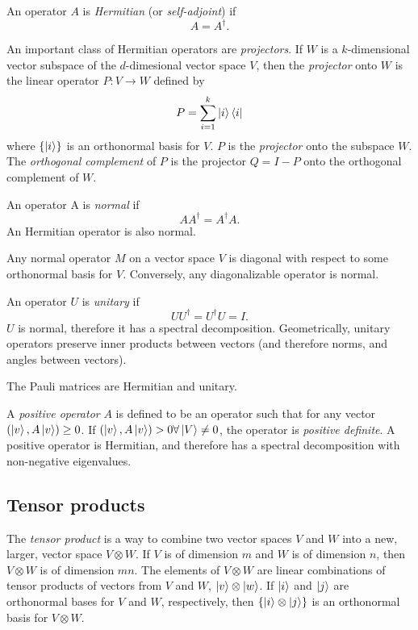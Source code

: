 An operator $A$ is \emph{Hermitian} (or \emph{self-adjoint}) if
\[
    A = A^\dagger.
\]

An important class of Hermitian operators are \emph{projectors}.
If $W$ is a $k$-dimensional vector subspace of the $d$-dimesional vector space $V$,
then the \emph{projector} onto $W$ is the linear operator $P: V \to W$ defined by
\[
    P = \sum_{i=1}^k \ket{i}\bra{i}
\]
where $\{\ket{i}\}$ is an orthonormal basis for $V$.
$P$ is the \emph{projector} onto the subspace $W$.
The \emph{orthogonal complement} of $P$ is the projector $Q = I-P$ onto the orthogonal complement of $W$.

An operator A is \emph{normal} if
\[
    AA^\dagger = A^\dagger A.
\]
An Hermitian operator is also normal.

\begin{theorem}
Any normal operator $M$ on a vector space $V$ is diagonal with respect to some orthonormal basis for $V$.
Conversely, any diagonalizable operator is normal.
\end{theorem}

An operator $U$ is \emph{unitary} if
\[
    UU^\dagger = U^\dagger U = I.
\]
$U$ is normal, therefore it has a spectral decomposition.
Geometrically, unitary operators preserve inner products between vectors
(and therefore norms, and angles between vectors).

The Pauli matrices are Hermitian and unitary.

A \emph{positive operator} $A$ is defined to be an operator such that for any vector $(\ket{v}, A\ket{v}) \geq 0$.
If $(\ket{v}, A\ket{v}) > 0 \forall \ket{V} \neq 0$, the operator is \emph{positive definite}.
A positive operator is Hermitian, and therefore has a spectral decomposition with non-negative eigenvalues.

\subsection{Tensor products}
The \emph{tensor product} is a way to combine two vector spaces $V$ and $W$ into a new, larger, vector space $V \otimes W$.
If $V$ is of dimension $m$ and $W$ is of dimension $n$, then $V \otimes W$ is of dimension $mn$.
The elements of $V \otimes W$ are linear combinations of tensor products of vectors from $V$ and $W$, $\ket{v} \otimes \ket{w}$.
If $\ket{i}$ and $\ket{j}$ are orthonormal bases for $V$ and $W$, respectively, then $\{\ket{i} \otimes \ket{j}\}$ is an orthonormal basis for $V \otimes W$.

